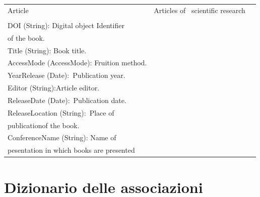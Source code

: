 \begin{longtable}{l|l|l}
Article  & \textcolor[rgb]{0.125,0.129,0.141}{Articles of~ scientific research}                                                                                       & \begin{tabular}[c]{@{}l@{}}\\\\DOI (String): Digital object Identifier \\of the book.\\Title (String): Book title.\\AccessMode (AccessMode): Fruition method.\\YearRelease (Date):~\textcolor[rgb]{0.125,0.129,0.141}{Publication year.}\\Editor (String):\textcolor[rgb]{0.125,0.129,0.141}{Article editor.}\\ReleaseDate (Date):~\textcolor[rgb]{0.125,0.129,0.141}{Publication date.}\\ReleaseLocation (String):~\textcolor[rgb]{0.125,0.129,0.141}{Place of}\\\textcolor[rgb]{0.125,0.129,0.141}{publication}\textcolor[rgb]{0.125,0.129,0.141}{of the book.}\\ConferenceName (String): Name of \\pesentation in which books are presented\textcolor[rgb]{0.125,0.129,0.141}{}\end{tabular}                                                                                                                                                                                                                                                                                                                                                                                                                                                                                                                                                                                                                                      \\
\hline
\end{longtable}


\newpage
\section{Dizionario delle associazioni}
